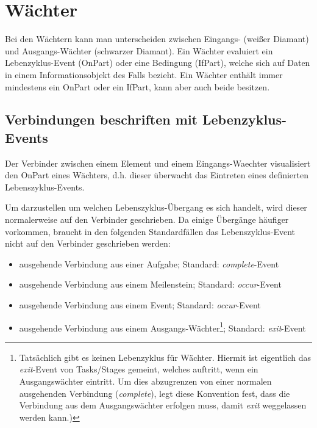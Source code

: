 \documentclass[12pt,report]{snetTeaching}
\begin{document}







\section{Wächter}

Bei den Wächtern kann man unterscheiden zwischen Eingangs- (weißer Diamant) und Ausgangs-Wächter (schwarzer Diamant). Ein Wächter evaluiert ein Lebenzyklus-Event (OnPart) oder eine Bedingung (IfPart), welche sich auf Daten in einem Informationsobjekt des Falls bezieht. Ein Wächter enthält immer mindestens ein OnPart oder ein IfPart, kann aber auch beide besitzen.

\subsection{Verbindungen beschriften mit Lebenzyklus-Events}
\label{konv:CMMN_VerbindungBeschriften}

Der Verbinder zwischen einem Element und einem Eingangs-\gls{Waechter} visualisiert den OnPart eines Wächters, d.h. dieser überwacht das Eintreten eines definierten Lebenszyklus-Events. 

Um darzustellen um welchen Lebenszyklus-Übergang es sich handelt, wird dieser normalerweise auf den Verbinder geschrieben. Da einige Übergänge häufiger vorkommen, braucht in den folgenden Standardfällen das Lebenszyklus-Event nicht auf den Verbinder geschrieben werden: 
\begin{itemize}
\item ausgehende Verbindung aus einer Aufgabe; Standard: \emph{complete}-Event
\item ausgehende Verbindung aus einem Meilenstein; Standard: \emph{occur}-Event
\item ausgehende Verbindung aus einem Event; Standard: \emph{occur}-Event
\item ausgehende Verbindung aus einem Ausgangs-Wächter\footnote{Tatsächlich gibt es keinen Lebenzyklus für Wächter. Hiermit ist eigentlich das \emph{exit}-Event von Tasks/Stages gemeint, welches auftritt, wenn ein Ausgangswächter eintritt. Um dies abzugrenzen von einer normalen ausgehenden Verbindung (\emph{complete}), legt diese Konvention fest, dass die Verbindung aus dem Ausgangswächter erfolgen muss, damit \emph{exit} weggelassen werden kann.)}; Standard: \emph{exit}-Event
\end{itemize}
\end{document}
